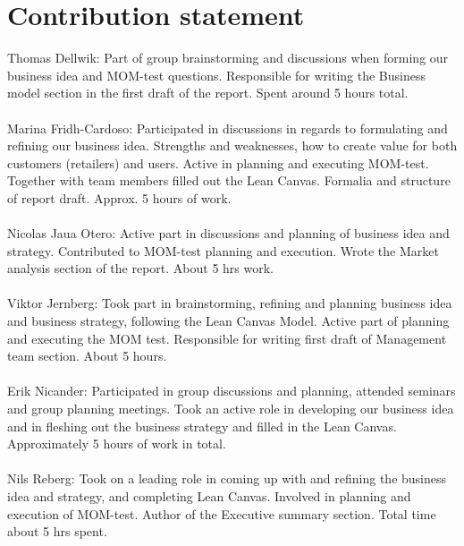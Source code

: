 \documentclass[titlepage]{article}
\begin{document}
\section{Contribution statement}
Thomas Dellwik: Part of group brainstorming and discussions when forming our business idea and MOM-test questions. Responsible for writing the Business model section in the first draft of the report. Spent around 5 hours total. \\
\\
Marina Fridh-Cardoso: Participated in discussions in regards to formulating and refining our business idea. Strengths and weaknesses, how to create value for both customers (retailers) and users. Active in planning and executing MOM-test. Together with team members filled out the Lean Canvas. Formalia and structure of report draft. Approx.  5 hours of work. \\
\\
Nicolas Jaua Otero: Active part in discussions and planning of business idea and strategy. Contributed to MOM-test planning and execution. Wrote the Market analysis section of the report. About 5 hrs work.\\
\\
Viktor Jernberg: Took part in brainstorming, refining and planning business idea and business strategy, following the Lean Canvas Model. Active part of planning and executing the MOM test. Responsible for writing first draft of Management team section. About 5 hours.\\
\\
Erik Nicander: Participated in group discussions and planning, attended seminars and group planning meetings. Took an active role in developing our business idea and in fleshing out the business strategy and filled in the Lean Canvas. Approximately 5 hours of work in total.\\
\\
Nils Reberg: Took on a leading role in coming up with and refining the business idea and strategy, and completing Lean Canvas.  Involved in planning and execution of MOM-test. Author of the Executive summary section. Total time about 5 hrs spent.\\
\end{document}
